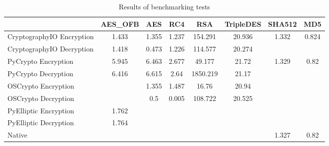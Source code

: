 \documentclass[10pt,conference]{IEEEtran}
\begin{document}
\begin{table}[]
\centering
\caption{Results of benchmarking tests}
\label{table:results1}
\begin{tabular}{|l|c|c|c|c|c|c|c|}
\hline
                          & AES\_OFB & AES   & RC4   & RSA      & TripleDES & SHA512 & MD5   \\ \hline
CryptographyIO Encryption & 1.433    & 1.355 & 1.237 & 154.291  & 20.936    & 1.332  & 0.824 \\ \hline
CryptographyIO Decryption & 1.418    & 0.473 & 1.226 & 114.577  & 20.274    &        &       \\ \hline
PyCrypto Encryption       & 5.945    & 6.463 & 2.677 & 49.177   & 21.72     & 1.329  & 0.82  \\ \hline
PyCrypto Decryption       & 6.416    & 6.615 & 2.64  & 1850.219 & 21.17     &        &       \\ \hline
OSCrypto Encryption       &          & 1.355 & 1.487 & 16.76    & 20.94     &        &       \\ \hline
OSCrypto Decryption       &          & 0.5   & 0.005 & 108.722  & 20.525    &        &       \\ \hline
PyElliptic Encryption     & 1.762    &       &       &          &           &        &       \\ \hline
PyElliptic Decryption     & 1.764    &       &       &          &           &        &       \\ \hline
Native                    &          &       &       &          &           & 1.327  & 0.82  \\ \hline
\end{tabular}
\end{table}
\end{document}
